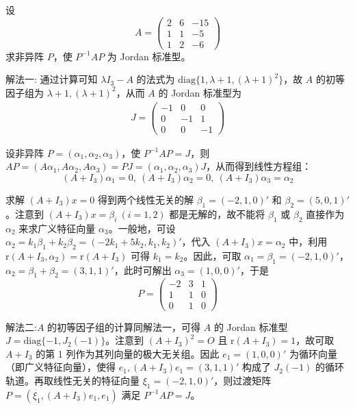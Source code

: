 \documentclass[../../main.tex]{subfiles}
\begin{document}
\begin{example}\label{example:2235890789}
设 
\[
A = \begin{pmatrix}
2 & 6 & -15 \\
1 & 1 & -5 \\
1 & 2 & -6
\end{pmatrix}
\]
求非异阵 $P$，使 $P^{-1}AP$ 为 Jordan 标准型。
\end{example}
\begin{solution}
{\color{blue}解法一:}
通过计算可知 $\lambda I_3 - A$ 的法式为 $\mathrm{diag}\{1,\lambda + 1,(\lambda + 1)^2\}$，故 $A$ 的初等因子组为 $\lambda + 1,(\lambda + 1)^2$，从而 $A$ 的 Jordan 标准型为
\begin{align*}
J = \begin{pmatrix}
-1 & 0 & 0 \\
0 & -1 & 1 \\
0 & 0 & -1
\end{pmatrix}
\end{align*}

设非异阵 $P = (\alpha_1,\alpha_2,\alpha_3)$，使 $P^{-1}AP = J$，则 $AP = (A\alpha_1,A\alpha_2,A\alpha_3) = PJ = (\alpha_1,\alpha_2,\alpha_3)J$，从而得到线性方程组：
\[(A + I_3)\alpha_1 = 0,\ (A + I_3)\alpha_2 = 0,\ (A + I_3)\alpha_3 = \alpha_2\]

求解 $(A + I_3)x = 0$ 得到两个线性无关的解 $\beta_1 = (-2,1,0)'$ 和 $\beta_2 = (5,0,1)'$。注意到 $(A + I_3)x = \beta_i\ (i = 1,2)$ 都是无解的，故不能将 $\beta_1$ 或 $\beta_2$ 直接作为 $\alpha_2$ 来求广义特征向量 $\alpha_3$。一般地，可设 $\alpha_2 = k_1\beta_1 + k_2\beta_2 = (-2k_1 + 5k_2,k_1,k_2)'$，代入 $(A + I_3)x = \alpha_2$ 中，利用 $\mathrm{r}(A + I_3,\alpha_2) = \mathrm{r}(A + I_3)$ 可得 $k_1 = k_2$。因此，可取 $\alpha_1 = \beta_1 = (-2,1,0)'$，$\alpha_2 = \beta_1 + \beta_2 = (3,1,1)'$，此时可解出 $\alpha_3 = (1,0,0)'$，于是
\[
P = \begin{pmatrix}
-2 & 3 & 1 \\
1 & 1 & 0 \\
0 & 1 & 0
\end{pmatrix}
\]

{\color{blue}解法二:}$A$ 的初等因子组的计算同解法一，可得 $A$ 的 Jordan 标准型 $J = \mathrm{diag}\{-1,J_2(-1)\}$。注意到 $(A + I_3)^2 = O$ 且 $\mathrm{r}(A + I_3) = 1$，故可取 $A + I_3$ 的第 1 列作为其列向量的极大无关组。因此 $e_1 = (1,0,0)'$ 为循环向量（即广义特征向量），使得 $e_1,(A + I_3)e_1 = (3,1,1)'$ 构成了 $J_2(-1)$ 的循环轨道。再取线性无关的特征向量 $\xi_1 = (-2,1,0)'$，则过渡矩阵 $P = (\xi_1,(A + I_3)e_1,e_1)$ 满足 $P^{-1}AP = J$。
\end{solution}
\end{document}
